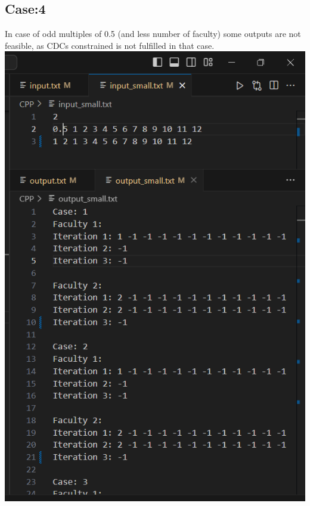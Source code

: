 \documentclass{article}
\begin{document}
\subsection{Case:4}
In case of odd multiples of 0.5 (and less number of faculty) some outputs are not feasible, as CDCs constrained is not fulfilled in that case.\\
\includegraphics[scale=0.5]{images/crash4.png}\\
\end{document}
